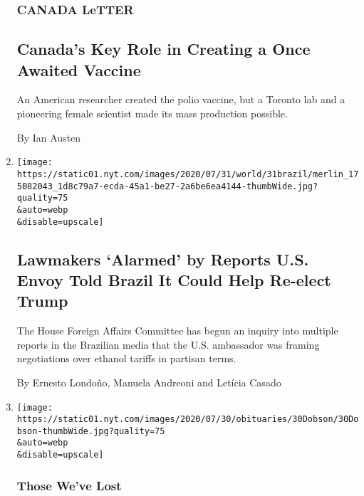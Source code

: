 \begin{enumerate}
{  \subsubsection{CANADA LeTTER}\label{canada-letter}}

  \hypertarget{canadas-key-role-in-creating-a-once-awaited-vaccine}{%
  \subsection{Canada's Key Role in Creating a Once Awaited
  Vaccine}\label{canadas-key-role-in-creating-a-once-awaited-vaccine}}

  An American researcher created the polio vaccine, but a Toronto lab
  and a pioneering female scientist made its mass production possible.

  By Ian Austen
\item
  \href{/2020/07/31/world/americas/brazil-trump-ethanol-chapman.html}{}

  \texttt{[image: https://static01.nyt.com/images/2020/07/31/world/31brazil/merlin\_175082043\_1d8c79a7-ecda-45a1-be27-2a6be6ea4144-thumbWide.jpg?quality=75\\\&auto=webp\\\&disable=upscale]}

  \hypertarget{lawmakers-alarmed-by-reports-us-envoy-told-brazil-it-could-help-re-elect-trump}{%
  \subsection{Lawmakers `Alarmed' by Reports U.S. Envoy Told Brazil It
  Could Help Re-elect
  Trump}\label{lawmakers-alarmed-by-reports-us-envoy-told-brazil-it-could-help-re-elect-trump}}

  The House Foreign Affairs Committee has begun an inquiry into multiple
  reports in the Brazilian media that the U.S. ambassador was framing
  negotiations over ethanol tariffs in partisan terms.

  By Ernesto Londoño, Manuela Andreoni and Letícia Casado
\item
  \href{/2020/07/31/obituaries/dobby-dobson-dead-coronavirus.html}{}

  \texttt{[image: https://static01.nyt.com/images/2020/07/30/obituaries/30Dobson/30Dobson-thumbWide.jpg?quality=75\\\&auto=webp\\\&disable=upscale]}

  \hypertarget{those-weve-lost}{%
  \subsubsection{Those We've Lost}\label{those-weve-lost}}


\end{enumerate}
